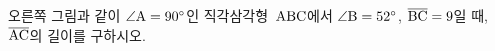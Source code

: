 \noindent\begin{minipage}[t]{0.58\linewidth}\vspace{0pt}\raggedright 오른쪽 그림과 같이 $\angle\mathrm{A}=90^\circ$인 직각삼각형~$\mathrm{ABC}$에서 $\angle\mathrm{B}=52^\circ$, $\overline{\mathrm{BC}}=9$일 때, $\overline{\mathrm{AC}}$의 길이를 구하시오. \end{minipage}\hfill\begin{minipage}[t]{0.4\linewidth}\vspace{0pt}\centering \resizebox{\ifdim\width>\linewidth\linewidth\else\width\fi}{!}{}\end{minipage}\par
